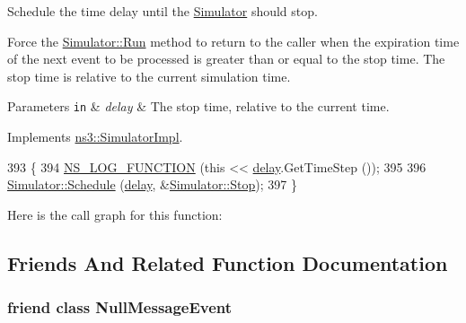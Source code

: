 Schedule the time delay until the \hyperlink{classns3_1_1Simulator}{Simulator} should stop.

Force the \hyperlink{classns3_1_1Simulator_a84be982e6d03b62c3dc3303c75a9b909}{Simulator\+::\+Run} method to return to the caller when the expiration time of the next event to be processed is greater than or equal to the stop time. The stop time is relative to the current simulation time. 
\begin{DoxyParams}[1]{Parameters}
\mbox{\tt in}  & {\em delay} & The stop time, relative to the current time. \\
\hline
\end{DoxyParams}


Implements \hyperlink{classns3_1_1SimulatorImpl_a8cd4ff5659b9f06af3da2897a1fea142}{ns3\+::\+Simulator\+Impl}.


\begin{DoxyCode}
393 \{
394   \hyperlink{log-macros-disabled_8h_a90b90d5bad1f39cb1b64923ea94c0761}{NS\_LOG\_FUNCTION} (\textcolor{keyword}{this} << \hyperlink{lte_2model_2fading-traces_2fading__trace__generator_8m_a7964e6aa8f61a9d28973c8267a606ad8}{delay}.GetTimeStep ());
395 
396   \hyperlink{classns3_1_1Simulator_a671882c894a08af4a5e91181bf1eec13}{Simulator::Schedule} (\hyperlink{lte_2model_2fading-traces_2fading__trace__generator_8m_a7964e6aa8f61a9d28973c8267a606ad8}{delay}, &\hyperlink{classns3_1_1Simulator_a2335ba5b62e9066e893fecb21b7f6afd}{Simulator::Stop});
397 \}
\end{DoxyCode}


Here is the call graph for this function\+:




\subsection{Friends And Related Function Documentation}
\subsubsection[{\texorpdfstring{Null\+Message\+Event}{NullMessageEvent}}]{\setlength{\rightskip}{0pt plus 5cm}friend class Null\+Message\+Event\hspace{0.3cm}{\ttfamily [friend]}}\hypertarget{classns3_1_1NullMessageSimulatorImpl_a43249f5b1c0f407d74e1918edb88a973}{}\label{classns3_1_1NullMessageSimulatorImpl_a43249f5b1c0f407d74e1918edb88a973}
